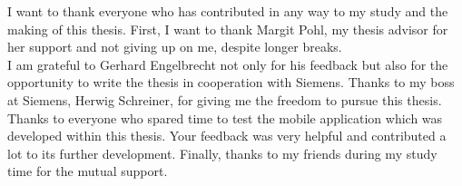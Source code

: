 \documentclass[draft,final]{vutinfth} %
\begin{document}
\frontmatter %

\addstatementpage

%
%
%

\begin{acknowledgements*}
I want to thank everyone who has contributed in any way to my study and the making of this thesis. First, I want to thank Margit Pohl, my thesis advisor for her support and not giving up on me, despite longer breaks. \\
I am grateful to Gerhard Engelbrecht not only for his feedback but also for the opportunity to write the thesis in cooperation with Siemens. Thanks to my boss at Siemens, Herwig Schreiner, for giving me the freedom to pursue this thesis.\\
Thanks to everyone who spared time to test the mobile application which was developed within this thesis. Your feedback was very helpful and contributed a lot to its further development. Finally, thanks to my friends during my study time for the mutual support.


\end{acknowledgements*}

\begin{kurzfassung}
\end{kurzfassung}

\begin{abstract}
\end{abstract}
\end{document}
